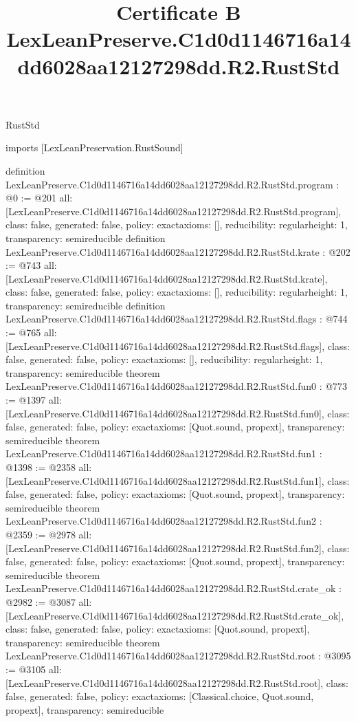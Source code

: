 \begin{lexlean}{RustStd}
\title{Certificate B LexLeanPreserve.C1d0d1146716a14dd6028aa12127298dd.R2.RustStd}
\begin{coremodule}
imports [LexLeanPreservation.RustSound]

definition LexLeanPreserve.C1d0d1146716a14dd6028aa12127298dd.R2.RustStd.program : @0 := @201 {
  all: [LexLeanPreserve.C1d0d1146716a14dd6028aa12127298dd.R2.RustStd.program],
  class: false,
  generated: false,
  policy: exact{axioms: []},
  reducibility: regular{height: 1},
  transparency: semireducible
}
definition LexLeanPreserve.C1d0d1146716a14dd6028aa12127298dd.R2.RustStd.krate : @202 := @743 {
  all: [LexLeanPreserve.C1d0d1146716a14dd6028aa12127298dd.R2.RustStd.krate],
  class: false,
  generated: false,
  policy: exact{axioms: []},
  reducibility: regular{height: 1},
  transparency: semireducible
}
definition LexLeanPreserve.C1d0d1146716a14dd6028aa12127298dd.R2.RustStd.flags : @744 := @765 {
  all: [LexLeanPreserve.C1d0d1146716a14dd6028aa12127298dd.R2.RustStd.flags],
  class: false,
  generated: false,
  policy: exact{axioms: []},
  reducibility: regular{height: 1},
  transparency: semireducible
}
theorem LexLeanPreserve.C1d0d1146716a14dd6028aa12127298dd.R2.RustStd.fun0 : @773 := @1397 {
  all: [LexLeanPreserve.C1d0d1146716a14dd6028aa12127298dd.R2.RustStd.fun0],
  class: false,
  generated: false,
  policy: exact{axioms: [Quot.sound, propext]},
  transparency: semireducible
}
theorem LexLeanPreserve.C1d0d1146716a14dd6028aa12127298dd.R2.RustStd.fun1 : @1398 := @2358 {
  all: [LexLeanPreserve.C1d0d1146716a14dd6028aa12127298dd.R2.RustStd.fun1],
  class: false,
  generated: false,
  policy: exact{axioms: [Quot.sound, propext]},
  transparency: semireducible
}
theorem LexLeanPreserve.C1d0d1146716a14dd6028aa12127298dd.R2.RustStd.fun2 : @2359 := @2978 {
  all: [LexLeanPreserve.C1d0d1146716a14dd6028aa12127298dd.R2.RustStd.fun2],
  class: false,
  generated: false,
  policy: exact{axioms: [Quot.sound, propext]},
  transparency: semireducible
}
theorem LexLeanPreserve.C1d0d1146716a14dd6028aa12127298dd.R2.RustStd.crate_ok : @2982 := @3087 {
  all: [LexLeanPreserve.C1d0d1146716a14dd6028aa12127298dd.R2.RustStd.crate_ok],
  class: false,
  generated: false,
  policy: exact{axioms: [Quot.sound, propext]},
  transparency: semireducible
}
theorem LexLeanPreserve.C1d0d1146716a14dd6028aa12127298dd.R2.RustStd.root : @3095 := @3105 {
  all: [LexLeanPreserve.C1d0d1146716a14dd6028aa12127298dd.R2.RustStd.root],
  class: false,
  generated: false,
  policy: exact{axioms: [Classical.choice, Quot.sound, propext]},
  transparency: semireducible
}


\end{coremodule}
\end{lexlean}
